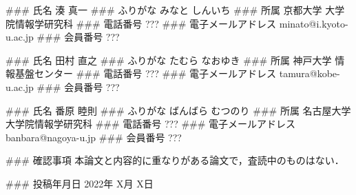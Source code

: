 ### 氏名
湊 真一
### ふりがな
みなと しんいち
### 所属
京都大学 大学院情報学研究科
### 電話番号
???
### 電子メールアドレス
minato@i.kyoto-u.ac.jp
### 会員番号
???

### 氏名
田村 直之
### ふりがな
たむら なおゆき
### 所属
神戸大学 情報基盤センター
### 電話番号
???
### 電子メールアドレス
tamura@kobe-u.ac.jp
### 会員番号
???

### 氏名
番原 睦則
### ふりがな
ばんばら むつのり
### 所属
名古屋大学 大学院情報学研究科
### 電話番号
???
### 電子メールアドレス
banbara@nagoya-u.jp
### 会員番号
???

### 確認事項
本論文と内容的に重なりがある論文で，査読中のものはない．

### 投稿年月日
2022年 X月 X日
